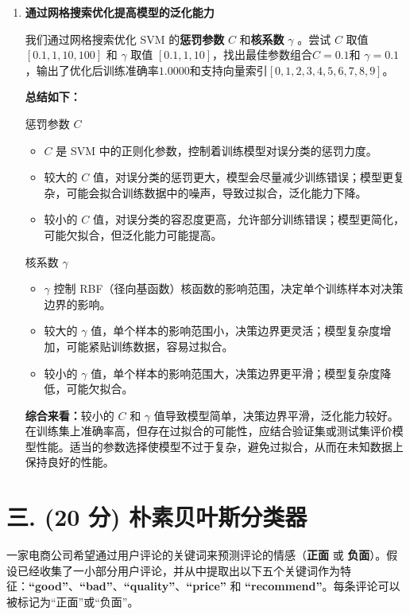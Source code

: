\documentclass[8pt]{article}
\begin{document}
\begin{enumerate}
    \item \textbf{通过网格搜索优化提高模型的泛化能力} 

    我们通过网格搜索优化 SVM 的\textbf{惩罚参数} \(C\) 和\textbf{核系数} \( \gamma \) 。尝试 \( C \) 取值 \([0.1, 1, 10, 100]\) 和 \( \gamma \) 取值 \([0.1, 1, 10]\)，找出最佳参数组合\( C = 0.1 \)和 \( \gamma  = 0.1\)，输出了优化后训练准确率\(1.0000\)和支持向量索引\([0, 1, 2, 3, 4, 5, 6, 7, 8, 9]\)。
    
    \textbf{总结如下：}

    惩罚参数 \(C\)
    \begin{itemize} 
        \item \(C\) 是 SVM 中的正则化参数，控制着训练模型对误分类的惩罚力度。
        \item 较大的 \(C\) 值，对误分类的惩罚更大，模型会尽量减少训练错误；模型更复杂，可能会拟合训练数据中的噪声，导致过拟合，泛化能力下降。
        \item 较小的 \(C\) 值，对误分类的容忍度更高，允许部分训练错误；模型更简化，可能欠拟合，但泛化能力可能提高。
    \end{itemize}
    核系数 \(\gamma\)
    \begin{itemize} 
        \item \(\gamma\) 控制 RBF（径向基函数）核函数的影响范围，决定单个训练样本对决策边界的影响。
        \item 较大的 \(\gamma\) 值，单个样本的影响范围小，决策边界更灵活；模型复杂度增加，可能紧贴训练数据，容易过拟合。
        \item 较小的 \(\gamma\) 值，单个样本的影响范围大，决策边界更平滑；模型复杂度降低，可能欠拟合。
    \end{itemize}
    \textbf{综合来看：}较小的 \(C\) 和 \(\gamma\) 值导致模型简单，决策边界平滑，泛化能力较好。在训练集上准确率高，但存在过拟合的可能性，应结合验证集或测试集评价模型性能。适当的参数选择使模型不过于复杂，避免过拟合，从而在未知数据上保持良好的性能。
\end{enumerate}

\vspace{3em}

\section*{三. (20 分) 朴素贝叶斯分类器}
一家电商公司希望通过用户评论的关键词来预测评论的情感（\textbf{正面} 或 \textbf{负面}）。假设已经收集了一小部分用户评论，并从中提取出以下五个关键词作为特征：\textbf{“good”}、\textbf{“bad”}、\textbf{“quality”}、\textbf{“price”} 和 \textbf{“recommend”}。每条评论可以被标记为“正面”或“负面”。
\end{document}
